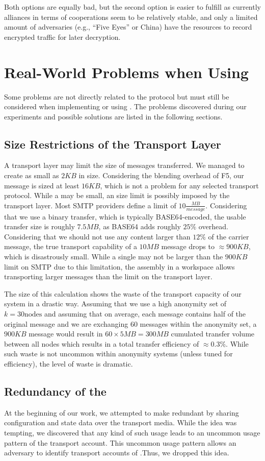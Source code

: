 Both options are equally bad, but the second option is easier to fulfill as currently alliances in terms of cooperations seem to be relatively stable, and only a limited amount of adversaries (e.g., ``Five Eyes'' or China) have the resources to record encrypted traffic for later decryption.

\chapter{Real-World Problems when Using \MessageVortex}\label{sec:realWorldProblems}
Some problems are not directly related to the \MessageVortex{} protocol but must still be considered when implementing or using \MessageVortex. The problems discovered during our experiments and possible solutions are listed in the following sections.

\section{Size Restrictions of the Transport Layer}
A transport layer may limit the size of messages transferred. We managed to create \VortexMessages{} as small as $2KB$ in size. Considering the blending overhead of F5, our message is sized at least $16KB$, which is not a problem for any selected transport protocol. While a \VortexMessage{} may be small, an size limit is possibly imposed by the transport layer. Most SMTP providers define a limit of $10\frac{MB}{message}$. Considering that we use a binary transfer, which is typically BASE64-encoded, the usable transfer size is roughly $7.5MB$, as BASE64 adds roughly $25\%$ overhead. Considering that we should not use any content larger than $12\%$ of the carrier message, the true transport capability of a $10MB$ message drops to $\approx 900KB$, which is disastrously small. While a single \VortexMessage{} may not be larger than the $900KB$ limit on SMTP due to this limitation, the assembly in a workspace allows transporting larger messages than the limit on the transport layer.

The size of this calculation shows the waste of the transport capacity of our system in a drastic way. Assuming that we use a high anonymity set of $k=30 \text{nodes}$ and assuming that on average, each message contains half of the original message and we are exchanging 60 messages within the anonymity set, a $900KB$ message would result in $60\times 5MB=300MB$ cumulated transfer volume between all nodes which results in a total transfer efficiency of $\approx 0.3\%$. While such waste is not uncommon within anonymity systems (unless tuned for efficiency), the level of waste is dramatic.

\section{Redundancy of the \VortexNode}
At the beginning of our work, we attempted to make \VortexNodes{} redundant by sharing configuration and state data over the transport media. While the idea was tempting, we discovered that any kind of such usage leads to an uncommon usage pattern of the transport account. This uncommon usage pattern allows an adversary to identify transport accounts of \VortexNodes.Thus, we dropped this idea. 